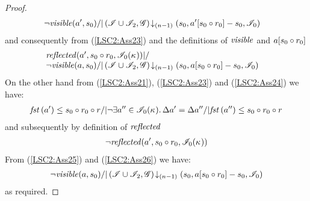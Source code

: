 \begin{lemma}
\begin{proof}
\begin{align*}
	&\neg\mathit{visible}(a', s_0) /| \left(\mathscr{I} \cup \mathscr{I}_2, \mathscr{G}\right) \!\downarrow_{(n-1)} \left(s_0, a'[s_0 \circ r_0] - s_0, \mathscr{I}_0\right)
\end{align*}
%
and consequently from (\ref{LSC2:Ass23}) and the definitions of $\mathit{visible}$ and $a[s_0 \circ r_0]$
%
\begin{align}
&\begin{array}{l}
	\mathit{reflected}(a', s_0 \circ r_0, \mathscr{I}_0(\kappa_{})) |/ \\
	\neg\mathit{visible}(a, s_0) /| \left(\mathscr{I} \cup \mathscr{I}_2, \mathscr{G}\right) \!\downarrow_{(n-1)} \left(s_0, a[s_0 \circ r_0] - s_0, \mathscr{I}_0\right)
\end{array} \label{LSC2:Ass25}
\end{align}
On the other hand from (\ref{LSC2:Ass21}), (\ref{LSC2:Ass23}) and (\ref{LSC2:Ass24}) we have:
%
\begin{align*}
	\mathit{fst}\left(a'\right) \leq s_0 \circ r_0 \circ r /| \neg\exists a'' \in \mathscr{I}_0(\kappa_{}).\, \Delta {a'} = \Delta {a''} /| \mathit{fst}\left(a''\right) \leq s_0 \circ r_0 \circ r 
\end{align*}
%
and subsequently by definition of $\mathit{reflected}$
%
\begin{align}
	\neg\mathit{reflected}(a', s_0 \circ r_0, \mathscr{I}_0(\kappa_{})) \label{LSC2:Ass26}
\end{align}
%
From (\ref{LSC2:Ass25}) and (\ref{LSC2:Ass26}) we have:
%
\begin{align*}
	\neg\mathit{visible}(a, s_0) /| \left(\mathscr{I} \cup \mathscr{I}_2, \mathscr{G}\right) \!\downarrow_{(n-1)} \left(s_0, a[s_0 \circ r_0] - s_0, \mathscr{I}_0\right)
\end{align*}
%
as required.
%
\end{proof}
%
\end{lemma}
%
%
%
